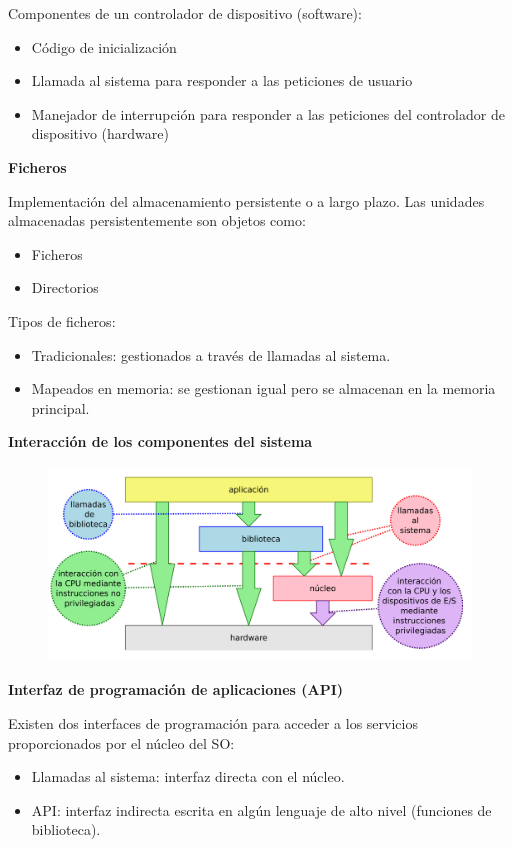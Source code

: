 \documentclass{article}
\begin{document}
Componentes de un controlador de dispositivo (software):
\begin{itemize}
\item Código de inicialización

\item Llamada al sistema para responder a las peticiones de usuario

\item Manejador de interrupción para responder a las peticiones del controlador de dispositivo (hardware)
\end{itemize}

\textbf{Ficheros}

Implementación del almacenamiento persistente o a largo plazo. Las unidades almacenadas persistentemente son objetos como:
\begin{itemize}
\item Ficheros

\item Directorios
\end{itemize}

Tipos de ficheros:
\begin{itemize}
\item Tradicionales: gestionados a través de llamadas al sistema.

\item Mapeados en memoria: se gestionan igual pero se almacenan en la memoria principal.
\end{itemize}

\textbf{Interacción de los componentes del sistema}

\begin{figure}[h]
\centering
\includegraphics[scale=1, width=\textwidth]{interaccion_sistema.png}
\end{figure}

\textbf{Interfaz de programación de aplicaciones (API)}

Existen dos interfaces de programación para acceder a los servicios proporcionados por el núcleo del SO:
\begin{itemize}
\item Llamadas al sistema: interfaz directa con el núcleo.

\item API: interfaz indirecta escrita en algún lenguaje de alto nivel (funciones de biblioteca).
\end{itemize}
\end{document}
